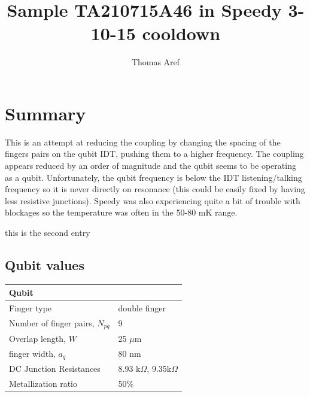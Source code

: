 \documentclass[12pt,a4paper]{article}
\newcommand{\pyb}[1]{} %
\newcommand{\pye}{} %
\begin{document}
\author{Thomas Aref}
\title{Sample TA210715A46 in Speedy 3-10-15 cooldown}
\maketitle
\noindent
\pyb {summary}
    \section{Summary}
    This is an attempt at reducing the coupling by changing the spacing of the fingers pairs on the qubit IDT, pushing them to a higher frequency.
    The coupling appears reduced by an order of magnitude and the qubit seems to be operating as a qubit.
    Unfortunately, the qubit frequency is below the IDT listening/talking frequency so it is never directly on resonance (this could be easily fixed by having less resistive junctions). Speedy was also experiencing quite a bit of trouble with blockages so the temperature was often in the 50-80 mK range.

\pye

\pyb {second entry}
this is the second entry
\pye

\subsection{Qubit values}
\begin{tabular}{|p{5 cm}|p{3 cm}|}
\hline
 Qubit & {} \\
\hline
 Finger type & double finger \\
\hline
 Number of finger pairs, $N_{pq}$ & 9 \\
\hline
 Overlap length, $W$ & 25 $\mu$m \\
\hline
 finger width, $a_q$ & 80 nm \\
\hline
 DC Junction Resistances & 8.93 k$\Omega$, 9.35k$\Omega$ \\
\hline
 Metallization ratio & 50\% \\
\hline
\end{tabular}
\end{document}
